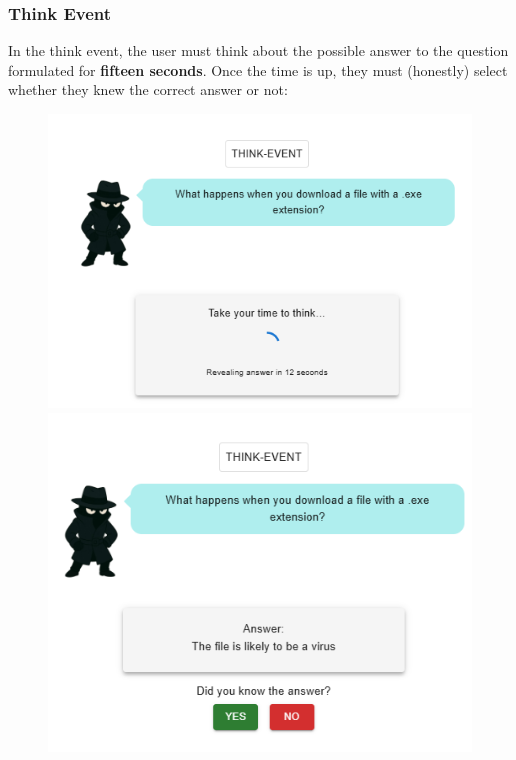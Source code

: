 \subsubsection{Think Event}
In the think event, the user must think about the possible answer to the question formulated for \textbf{fifteen seconds}. Once the
time is up, they must (honestly) select whether they knew the correct answer or not:
\begin{figure}[htbp]
    \centering
    \begin{minipage}[t]{0.49\textwidth}
        \includegraphics[width=\textwidth]{images/Think_Event.png}
    \end{minipage}
    \hfill
    \begin{minipage}[t]{0.49\textwidth}
        \includegraphics[width=\textwidth]{images/Think_Event_2.png}
    \end{minipage}
\end{figure}

